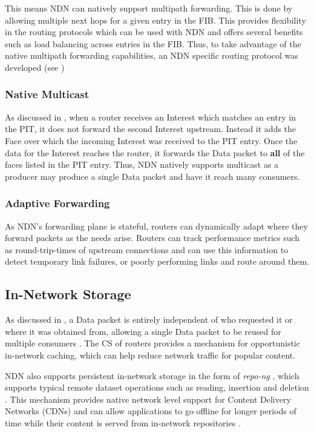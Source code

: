 This means NDN can natively support multipath forwarding. This is done by allowing multiple next hops for a given entry in the FIB. This provides flexibility in the routing protocols which can be used with NDN and offers several benefits such as load balancing across entries in the FIB. Thus, to take advantage of the native multipath forwarding capabilities, an NDN specific routing protocol was developed (see )

\subsubsection*{Native Multicast}
As discussed in , when a router receives an Interest which matches an entry in the PIT, it does not forward the second Interest upstream. Instead it adds the Face over which the incoming Interest was received to the PIT entry. Once the data for the Interest reaches the router, it forwards the Data packet to \textbf{all} of the faces listed in the PIT entry. Thus, NDN natively supports multicast as a producer may produce a single Data packet and have it reach many consumers. 

\subsubsection*{Adaptive Forwarding}
As NDN's forwarding plane is stateful, routers can dynamically adapt where they forward packets as the needs arise. Routers can track performance metrics such as round-trip-times of upstream connections and can use this information to detect temporary link failures, or poorly performing links and route around them.

\subsection{In-Network Storage}
As discussed in , a Data packet is entirely independent of who requested it or where it was obtained from, allowing a single Data packet to be reused for multiple consumers \cite{ndn}. The CS of routers provides a mechanism for opportunistic in-network caching, which can help reduce network traffic for popular content. 

NDN also supports persistent in-network storage in the form of \textit{repo-ng} \cite{ndn-repo}, which supports typical remote dataset operations such as reading, insertion and deletion \cite{ndn-repo-homepage}. This mechanism provides native network level support for Content Delivery Networks (CDNs) and can allow applications to go offline for longer periods of 
time while their content is served from in-network repositories \cite{ndn}.



